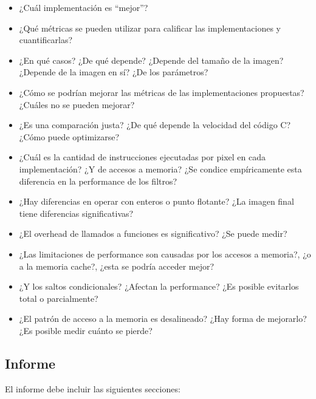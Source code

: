\documentclass[a4paper, 12pt]{article}
\begin{document}
\begin{itemize}
\item ¿Cuál implementación es ``mejor''?
\item ¿Qué métricas se pueden utilizar para calificar las implementaciones y cuantificarlas?
\item ¿En qué casos? ¿De qué depende? ¿Depende del tamaño de la imagen? ¿Depende de la imagen en sí? ¿De los parámetros?
\item ¿Cómo se podrían mejorar las métricas de las implementaciones propuestas? ¿Cuáles no se pueden mejorar?
\item ¿Es una comparación justa? ¿De qué depende la velocidad del
código C? ¿Cómo puede optimizarse?
\item ¿Cuál es la cantidad de instrucciones ejecutadas por pixel en cada implementación? ¿Y de accesos a memoria? ¿Se condice empíricamente esta diferencia en la performance de los filtros?
\item ¿Hay diferencias en operar con enteros o punto flotante? ¿La imagen final tiene diferencias significativas?
\item ¿El overhead de llamados a funciones es significativo? ¿Se puede medir?
\item ¿Las limitaciones de performance son causadas por los accesos a memoria?, ¿o a la memoria cache?, ¿esta se podría acceder mejor?
\item ¿Y los saltos condicionales? ¿Afectan la performance? ¿Es posible evitarlos total o parcialmente?
\item ¿El patrón de acceso a la memoria es desalineado? ¿Hay forma de mejorarlo? ¿Es posible medir cuánto se pierde?
\end{itemize}


\subsection{Informe}

El informe debe incluir las siguientes secciones:
\end{document}

